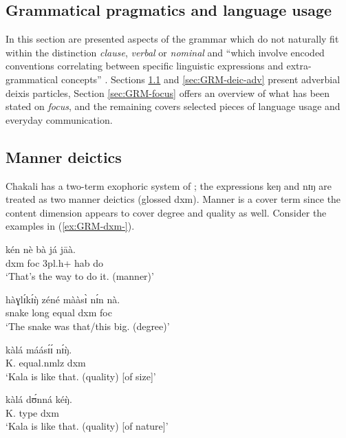 \begin{exe}
\begin{exe}
\begin{exe}
\begin{exe}
\begin{exe}
\begin{exe}
\begin{exe}
\begin{exe}
\begin{exe}
\begin{exe}
\begin{exe}
\begin{exe}
\section{Grammatical pragmatics and language usage}
\label{sec:GRM-adjuncts}

In this section are presented aspects of the grammar which do not naturally fit within the distinction \textit{clause},  \textit{verbal} or \textit{nominal} and ``which involve encoded conventions correlating between specific linguistic expressions and extra-grammat\-i\-cal concepts'' \citep[256]{arie10}. Sections \ref{sec:GRM-adv-pro} and \ref{sec:GRM-deic-adv} present  adverbial deixis particles, Section \ref{sec:GRM-focus} offers an overview of what has been stated on \textit{focus}, and the remaining covers selected  pieces of language usage and everyday communication. 


\subsection{Manner deictics}
\label{sec:GRM-adv-pro}

Chakali has a two-term exophoric system of  \citep{koen12}; the  expressions  {\sls keŋ} and {\sls nɪŋ} are treated as  two manner deictics  (glossed {\sc dxm}).  Manner is a cover term since the content dimension appears to cover degree and  quality as well. Consider the examples in (\ref{ex:GRM-dxm-}).

\ea\label{ex:GRM-dxm-}
 \ea\label{ex:GRM-dxm-1}
\gll kén nè bà já jāà.\\
{\sc dxm} {\sc foc}  {\sc 3pl.h+}  {\sc hab} do  \\
\glt `That's the way to do it. (manner)'  

  \ex\label{ex:GRM-dxm-2}
\gll  hàɣlɪ́kɪ́ŋ̀ zéné mààsɪ̀ nɪ́n nà.\\
snake long equal {\sc dxm}  {\sc foc}\\
\glt `The snake was that/this big. (degree)'  

  \ex\label{ex:GRM-dxm-3}
  
  
\gll  kàlá máásɪ́ɪ́ nɪ́ŋ̀.\\
K. equal.{\sc nmlz} {\sc dxm}\\
\glt `Kala is like that. (quality) [of size]'  

  \ex\label{ex:GRM-dxm-4}
  
  
\gll kàlá dʊ́nná kéŋ̀.\\
K. type {\sc dxm}\\
\glt `Kala is like that. (quality) [of nature]'  


\end{exe}
\end{exe}
\end{exe}
\end{exe}
\end{exe}
\end{exe}
\end{exe}
\end{exe}
\end{exe}
\end{exe}
\end{exe}
\end{exe}
